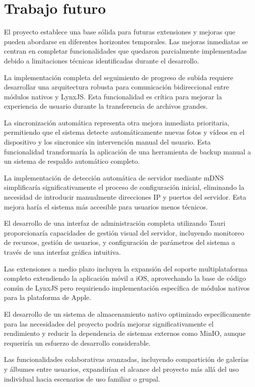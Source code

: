 \section{Trabajo futuro}

El proyecto establece una base sólida para futuras extensiones y mejoras que pueden abordarse en diferentes horizontes temporales. Las mejoras inmediatas se centran en completar funcionalidades que quedaron parcialmente implementadas debido a limitaciones técnicas identificadas durante el desarrollo.

La implementación completa del seguimiento de progreso de subida requiere desarrollar una arquitectura robusta para comunicación bidireccional entre módulos nativos y LynxJS. Esta funcionalidad es crítica para mejorar la experiencia de usuario durante la transferencia de archivos grandes.

La sincronización automática representa otra mejora inmediata prioritaria, permitiendo que el sistema detecte automáticamente nuevas fotos y vídeos en el dispositivo y los sincronice sin intervención manual del usuario. Esta funcionalidad transformaría la aplicación de una herramienta de backup manual a un sistema de respaldo automático completo.

La implementación de detección automática de servidor mediante mDNS simplificaría significativamente el proceso de configuración inicial, eliminando la necesidad de introducir manualmente direcciones IP y puertos del servidor. Esta mejora haría el sistema más accesible para usuarios menos técnicos.

El desarrollo de una interfaz de administración completa utilizando Tauri proporcionaría capacidades de gestión visual del servidor, incluyendo monitoreo de recursos, gestión de usuarios, y configuración de parámetros del sistema a través de una interfaz gráfica intuitiva.

Las extensiones a medio plazo incluyen la expansión del soporte multiplataforma completo extendiendo la aplicación móvil a iOS, aprovechando la base de código común de LynxJS pero requiriendo implementación específica de módulos nativos para la plataforma de Apple.

El desarrollo de un sistema de almacenamiento nativo optimizado específicamente para las necesidades del proyecto podría mejorar significativamente el rendimiento y reducir la dependencia de sistemas externos como MinIO, aunque requeriría un esfuerzo de desarrollo considerable.

Las funcionalidades colaborativas avanzadas, incluyendo compartición de galerías y álbumes entre usuarios, expandirían el alcance del proyecto más allá del uso individual hacia escenarios de uso familiar o grupal.

